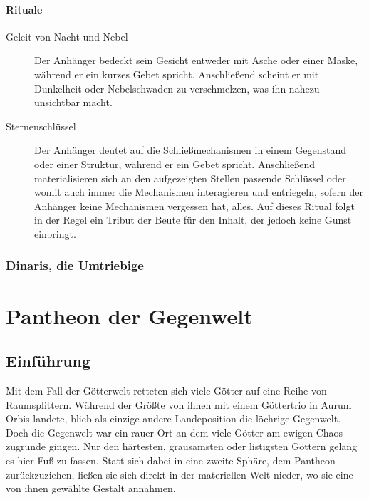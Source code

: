 \documentclass[a4paper,12pt,oneside]{book}
\begin{document}
\subsubsection{Rituale}
\begin{description}
\item[Geleit von Nacht und Nebel]
Der Anhänger bedeckt sein Gesicht entweder mit Asche oder einer Maske, während er ein kurzes Gebet spricht. Anschließend scheint er mit Dunkelheit oder Nebelschwaden zu verschmelzen, was ihn nahezu unsichtbar macht.
\item[Sternenschlüssel]
Der Anhänger deutet auf die Schließmechanismen in einem Gegenstand oder einer Struktur, während er ein Gebet spricht. Anschließend materialisieren sich an den aufgezeigten Stellen passende Schlüssel oder womit auch immer die Mechanismen interagieren und entriegeln, sofern der Anhänger keine Mechanismen vergessen hat, alles. Auf dieses Ritual folgt in der Regel ein Tribut der Beute für den Inhalt, der jedoch keine Gunst einbringt.
\end{description}

\subsection{Dinaris, die Umtriebige}


\chapter{Pantheon der Gegenwelt}

\section{Einführung}
Mit dem Fall der Götterwelt retteten sich viele Götter auf eine Reihe von Raumsplittern. Während der Größte von ihnen mit einem Göttertrio in Aurum Orbis landete, blieb als einzige andere Landeposition die löchrige Gegenwelt. Doch die Gegenwelt war ein rauer Ort an dem viele Götter am ewigen Chaos zugrunde gingen. Nur den härtesten, grausamsten oder listigsten Göttern gelang es hier Fuß zu fassen. Statt sich dabei in eine zweite Sphäre, dem Pantheon zurückzuziehen, ließen sie sich direkt in der materiellen Welt nieder, wo sie eine von ihnen gewählte Gestalt annahmen.
\end{document}
